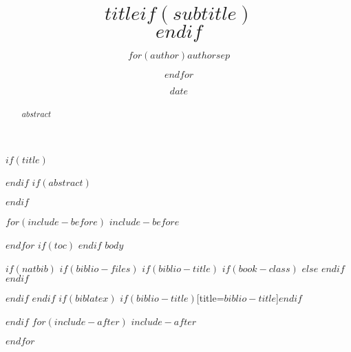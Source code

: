 \documentclass[$if(fontsize)$$fontsize$,$endif$$if(lang)$$lang$,$endif$$if(papersize)$$papersize$,$endif$$for(classoption)$$classoption$$sep$,$endfor$]{$documentclass$}
\title{$title$$if(subtitle)$\\\vspace{0.5em}{\large $subtitle$}$endif$}
\author{$for(author)$$author$$sep$ \and $endfor$}
\date{$date$}
\begin{document}
$if(title)$
\maketitle
$endif$
$if(abstract)$
\begin{abstract}
$abstract$
\end{abstract}
$endif$

$for(include-before)$
$include-before$

$endfor$
$if(toc)$
{
\hypersetup{linkcolor=black}
\setcounter{tocdepth}{$toc-depth$}
\tableofcontents
}
$endif$
$body$

$if(natbib)$
$if(biblio-files)$
$if(biblio-title)$
$if(book-class)$
\renewcommand\bibname{$biblio-title$}
$else$
\renewcommand\refname{$biblio-title$}
$endif$
$endif$


$endif$
$endif$
$if(biblatex)$
\printbibliography$if(biblio-title)$[title=$biblio-title$]$endif$

$endif$
$for(include-after)$
$include-after$

$endfor$
\end{document}
